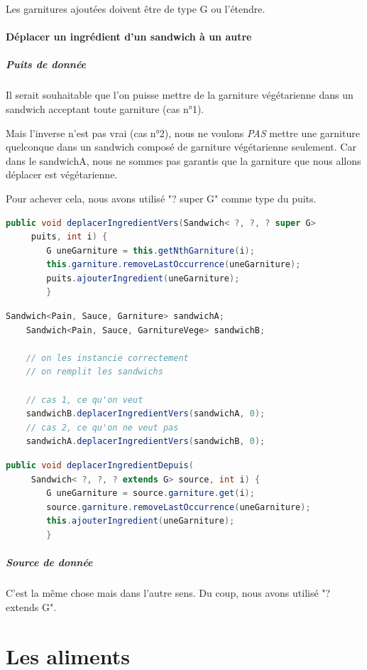 \documentclass[a4paper]{article}
\begin{document}
Les garnitures ajoutées doivent être de type G ou l'étendre.
\clearpage
\paragraph{Déplacer un ingrédient d'un sandwich à un autre}
\subparagraph{Puits de donnée}
Il serait souhaitable que l'on puisse mettre de la garniture végétarienne dans un 
sandwich acceptant toute garniture (cas n°1). 

Mais l'inverse n'est pas vrai 
(cas n°2), nous ne voulons \emph{PAS} mettre une garniture quelconque dans un 
sandwich composé de garniture végétarienne seulement. Car dans le sandwichA, nous 
ne sommes pas garantis que la garniture que nous allons déplacer est végétarienne.

Pour achever cela, nous avons utilisé "? super G" comme type du puits.
\begin{lstlisting}[language=Java, caption=Déplacer l'ingrédient d'indice i depuis this aux puits]
    public void deplacerIngredientVers(Sandwich< ?, ?, ? super G>
     puits, int i) {
        G uneGarniture = this.getNthGarniture(i);
        this.garniture.removeLastOccurrence(uneGarniture);
        puits.ajouterIngredient(uneGarniture);
        }
\end{lstlisting}
\begin{lstlisting}[language=Java, caption=Exemple puis de donnée]
    Sandwich<Pain, Sauce, Garniture> sandwichA;
    Sandwich<Pain, Sauce, GarnitureVege> sandwichB;
    
    // on les instancie correctement
    // on remplit les sandwichs
        
    // cas 1, ce qu'on veut 
    sandwichB.deplacerIngredientVers(sandwichA, 0);
    // cas 2, ce qu'on ne veut pas
    sandwichA.deplacerIngredientVers(sandwichB, 0); 
\end{lstlisting}
\begin{lstlisting}[language=Java, caption=Déplacer l'ingrédient d'indice i du puits jusqu'à this]
    public void deplacerIngredientDepuis(
     Sandwich< ?, ?, ? extends G> source, int i) {
        G uneGarniture = source.garniture.get(i);
        source.garniture.removeLastOccurrence(uneGarniture);
        this.ajouterIngredient(uneGarniture);
        }
\end{lstlisting}
\subparagraph{Source de donnée}
C'est la même chose mais dans l'autre sens. Du coup, nous avons utilisé "? extends G".

\clearpage
\section{Les aliments}
\end{document}
